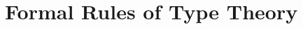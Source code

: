 \chapter{Formal Rules of Type Theory}
{

\newcommand{\production}{\vcentcolon\vcentcolon=}

\newcommand{\mkbox}[1]{\ensuremath{#1}}

\newcommand{\Prod}[2]{\displaystyle\prod _{#1}~#2}
\newcommand{\Sum}[2]{\displaystyle\sum _{#1}~#2}

\newcommand{\app}{\mathsf{app}}

\newcommand{\gothic}{\mathfrak}
\newcommand{\gP}{{\gothic p}}
\newcommand{\gM}{{\gothic M}}
\newcommand{\gN}{{\gothic N}}
\newcommand{\rats}{\mathbb{Q}}
\newcommand{\ints}{\mathbb{Z}}







\newcommand{\lbr}{\lbrack\!\lbrack}
\newcommand{\rbr}{\rbrack\!\rbrack}
\newcommand{\sem}[2] {\lbr #1 \rbr_{#2}}  %
\newcommand{\APP}[2] {{\sf app}(#1,#2)}  %
\newcommand{\nats}{\mathbb{N}}
\newcommand{\Con}{{\sf Con}}
\newcommand{\myType}{{\sf Type}}
\newcommand{\Elem}{{\sf Elem}}
\newcommand{\myId}{1}
\newcommand{\mypp}{{\sf p}}
\newcommand{\qq}{{\sf q}}
\newcommand{\mySp}{{\sf Sp}}

\newcommand{\conv}{~{\sf conv}~}
\newcommand{\SUP}{{\sf sup}}
\newcommand{\PAIR}{{\sf pair}}
\newcommand{\mysuc}{{\sf s}}
\newcommand{\myUU}{{\sf U}}
\newcommand{\WW}{{\sf W}}
\newcommand{\NN}{{\sf N}}
\newcommand{\Ord}{{\sf Ord}}
\newcommand{\LIM}{{\sf lim}}
\newcommand{\nn}{{\sf n}}
\newcommand{\myzero}{{\sf 0}}

}
